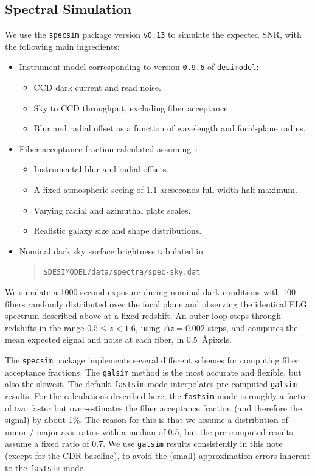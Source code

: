 \documentclass[12pt]{article}
\begin{document}
\subsection{Spectral Simulation}

We use the {\tt specsim} package version {\tt v0.13} to simulate the expected SNR, with the following main ingredients:
\begin{itemize}
    \item Instrument model corresponding to version {\tt 0.9.6} of {\tt desimodel}:
    \begin{itemize}
        \item CCD dark current and read noise.
        \item Sky to CCD throughput, excluding fiber acceptance.
        \item Blur and radial offset as a function of wavelength and focal-plane radius.
    \end{itemize}
    \item Fiber acceptance fraction calculated assuming~\cite{desi-2720}:
    \begin{itemize}
        \item Instrumental blur and radial offsets.
        \item A fixed atmospheric seeing of 1.1 arcseconds full-width half maximum.
        \item Varying radial and azimuthal plate scales.
        \item Realistic galaxy size and shape distributions.
    \end{itemize}
    \item Nominal dark sky surface brightness tabulated in
    \begin{quote}
        {\tt \$DESIMODEL/data/spectra/spec-sky.dat}
    \end{quote}
\end{itemize}
We simulate a 1000 second exposure during nominal dark conditions with 100 fibers randomly distributed over the focal plane and observing the identical ELG spectrum
described above at a fixed redshift.  An outer loop steps through redshifts in the range $0.5 \le z < 1.6$, using $\Delta z = 0.002$ steps,
and computes the mean expected signal and noise at each fiber, in 0.5~\AA pixels.

The {\tt specsim} package implements several different schemes for computing fiber acceptance fractions.  The {\tt galsim} method is the most accurate and flexible, but
also the slowest.  The default {\tt fastsim} mode interpolates pre-computed {\tt galsim} results.  For the calculations described here, the {\tt fastsim} mode is roughly
a factor of two faster but over-estimates the fiber acceptance fraction (and therefore the signal) by about 1\%. The reason for this is that we assume a
distribution of minor / major axis ratios with a median of 0.5, but the pre-computed results assume a fixed ratio of 0.7.  We use {\tt galsim}
results consistently in this note (except for the CDR baseline), to avoid the (small) approximation errors inherent to the {\tt fastsim} mode.
\end{document}
